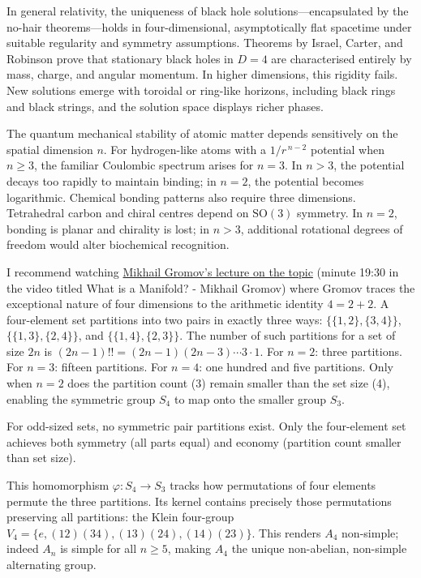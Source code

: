 In general relativity, the uniqueness of black hole solutions—encapsulated by the no-hair theorems—holds in four-dimensional, asymptotically flat spacetime under suitable regularity and symmetry assumptions. Theorems by Israel, Carter, and Robinson prove that stationary black holes in $D=4$ are characterised entirely by mass, charge, and angular momentum. In higher dimensions, this rigidity fails. New solutions emerge with toroidal or ring-like horizons, including black rings and black strings, and the solution space displays richer phases.

The quantum mechanical stability of atomic matter depends sensitively on the spatial dimension $n$. For hydrogen-like atoms with a $1/r^{\,n-2}$ potential when $n\ge 3$, the familiar Coulombic spectrum arises for $n=3$. In $n>3$, the potential decays too rapidly to maintain binding; in $n=2$, the potential becomes logarithmic. Chemical bonding patterns also require three dimensions. Tetrahedral carbon and chiral centres depend on $\mathrm{SO}(3)$ symmetry. In $n=2$, bonding is planar and chirality is lost; in $n>3$, additional rotational degrees of freedom would alter biochemical recognition.

I recommend watching \href{http://youtu.be/u5DLpAqX4YA&t=1170s}{Mikhail Gromov's lecture on the topic} (minute 19:30 in the video titled \QENOpen{}What is a Manifold? - Mikhail Gromov\QENClose{}) where Gromov traces the exceptional nature of four dimensions to the arithmetic identity $4 = 2 + 2$. A four-element set partitions into two pairs in exactly three ways: $\{\{1,2\}, \{3,4\}\}$, $\{\{1,3\}, \{2,4\}\}$, and $\{\{1,4\}, \{2,3\}\}$. The number of such partitions for a set of size $2n$ is $(2n-1)!! = (2n-1)(2n-3)\cdots 3 \cdot 1$. For $n=2$: three partitions. For $n=3$: fifteen partitions. For $n=4$: one hundred and five partitions. Only when $n=2$ does the partition count (3) remain smaller than the set size (4), enabling the symmetric group $S_4$ to map onto the smaller group $S_3$.

For odd-sized sets, no symmetric pair partitions exist. Only the four-element set achieves both symmetry (all parts equal) and economy (partition count smaller than set size).

This homomorphism $\varphi: S_4 \to S_3$ tracks how permutations of four elements permute the three partitions. Its kernel contains precisely those permutations preserving all partitions: the Klein four-group $V_4 = \{e, (12)(34), (13)(24), (14)(23)\}$. This renders $A_4$ non-simple; indeed $A_n$ is simple for all $n\ge 5$, making $A_4$ the unique non-abelian, non-simple alternating group.

